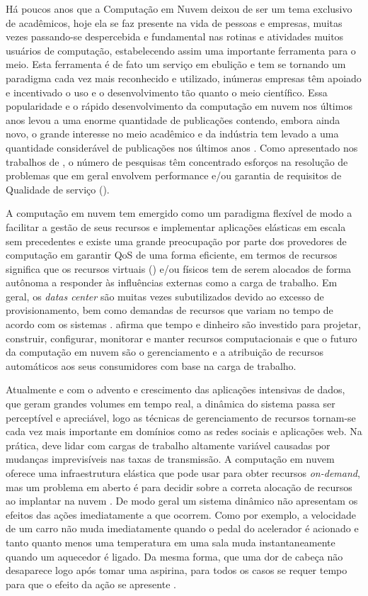 Há poucos anos que a Computação em Nuvem deixou de ser um tema exclusivo de acadêmicos, hoje ela se faz presente na vida de pessoas e empresas, muitas vezes passando-se despercebida e fundamental nas rotinas e atividades muitos usuários de computação, estabelecendo assim uma importante ferramenta para o meio. Esta ferramenta é de fato um serviço em ebulição e tem se tornando um paradigma cada vez mais reconhecido e utilizado, inúmeras empresas têm apoiado e incentivado o uso e o desenvolvimento tão quanto o meio científico. Essa popularidade e o rápido desenvolvimento da computação em nuvem nos últimos anos levou a uma enorme quantidade de publicações contendo, embora ainda novo, o grande interesse no meio acadêmico e da indústria tem levado a uma quantidade considerável de publicações nos últimos anos \cite{Heilig2014}.
Como apresentado nos trabalhos de \cite{Heilig2014, Yang2012}, o  número de pesquisas têm concentrado esforços na resolução de problemas que em geral envolvem performance e/ou garantia de requisitos de Qualidade de serviço (\textit{}). 

A computação em nuvem tem emergido como um paradigma flexível de modo a facilitar a gestão de seus recursos e implementar aplicações elásticas em escala sem precedentes \cite{Cervino2012} e existe uma grande preocupação por parte dos provedores de computação em garantir QoS de uma forma eficiente, em termos de recursos significa que os recursos virtuais (\textit{}) e/ou físicos tem de serem alocados de forma autônoma a responder às influências externas como a carga de trabalho. Em geral, os \textit{datas center} são muitas vezes subutilizados devido ao excesso de provisionamento, bem como demandas de recursos que variam no tempo de acordo com os sistemas \cite{Padala2007}. \cite{Inomata2011} afirma que tempo e dinheiro são investido para projetar, construir, configurar, monitorar e manter recursos computacionais e que o futuro da computação em nuvem são o gerenciamento e a atribuição de recursos automáticos aos seus consumidores com base na carga de trabalho.

Atualmente e com o advento e crescimento das aplicações intensivas de dados, que geram grandes volumes em tempo real, a dinâmica do sistema passa ser perceptível e apreciável, logo as técnicas de gerenciamento de recursos tornam-se cada vez mais importante em domínios como as redes sociais e aplicações web. Na prática, deve lidar com cargas de trabalho altamente variável causadas por mudanças imprevisíveis nas taxas de transmissão. A computação em nuvem oferece uma infraestrutura elástica que pode usar para obter recursos \textit{on-demand}, mas um problema em aberto é para decidir sobre a correta alocação de recursos ao implantar na nuvem \cite{Cervino2012}. De modo geral um sistema dinâmico não apresentam os efeitos das ações imediatamente a que ocorrem. Como por exemplo, a velocidade de um carro não muda imediatamente quando o pedal do acelerador é acionado e tanto quanto menos uma temperatura em uma sala muda instantaneamente quando um aquecedor é ligado. Da mesma forma, que uma dor de cabeça não desaparece logo após tomar uma aspirina, para todos os casos se requer tempo para que o efeito da ação se apresente \cite{Karl2008}.


